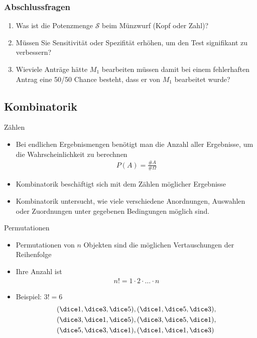 \begin{frame}
  \frametitle{Abschlussfragen}
  
  \begin{enumerate}
  \item Was ist die Potenzmenge $\mathcal{S}$ beim Münzwurf (Kopf oder Zahl)?
  \item Müssen Sie Sensitivität oder Spezifität erhöhen, um den Test
    signifikant zu verbessern?
  \item Wieviele Anträge hätte $M_1$ bearbeiten müssen damit bei einem
    fehlerhaften Antrag eine 50/50 Chance besteht, dass er von $M_1$
    bearbeitet wurde?
  \end{enumerate}
\end{frame}
  


\subsection{Kombinatorik}

\begin{frame}{Zählen}
  \begin{itemize}
  \item Bei endlichen Ergebnismengen benötigt man die Anzahl aller
    Ergebnisse, um die Wahrscheinlichkeit zu berechnen
    \begin{gather*}
      P(A) = \frac{\#A}{\#\Omega}
    \end{gather*}
  \item Kombinatorik beschäftigt sich mit dem Zählen möglicher Ergebnisse
  \item Kombinatorik untersucht, wie viele verschiedene Anordnungen,
    Auswahlen oder Zuordnungen unter gegebenen Bedingungen möglich
    sind.
  \end{itemize}
\end{frame}

\begin{frame}{Permutationen}
  \begin{itemize}
  \item Permutationen von $n$ Objekten sind die möglichen Vertauschungen der Reihenfolge
  \item Ihre Anzahl ist
    \begin{gather*}
      n! = 1\cdot 2\cdot \ldots \cdot n      
    \end{gather*}
  \item Beispiel: $3!=6$
    \begin{gather*}
      (\dice1,\dice3,\dice5),(\dice1,\dice5,\dice3),\\
      (\dice3,\dice1,\dice5),(\dice3,\dice5,\dice1),\\
      (\dice5,\dice3,\dice1),(\dice1,\dice1,\dice3)\phantom{,}
    \end{gather*}
  \end{itemize}
\end{frame}



